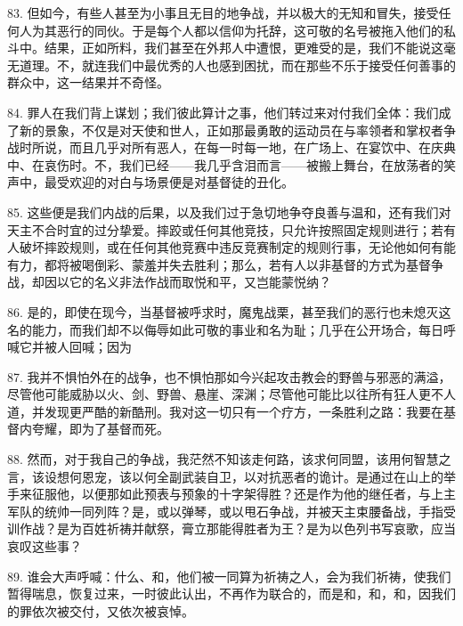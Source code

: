 83. 但如今，有些人甚至为小事且无目的地争战，并以极大的无知和冒失，接受任何人为其恶行的同伙。于是每个人都以信仰为托辞，这可敬的名号被拖入他们的私斗中。结果，正如所料，我们甚至在外邦人中遭恨，更难受的是，我们不能说这毫无道理。不，就连我们中最优秀的人也感到困扰，而在那些不乐于接受任何善事的群众中，这一结果并不奇怪。\par

84. 罪人在我们背上谋划；我们彼此算计之事，他们转过来对付我们全体：我们成了新的景象，不仅是对天使和世人，正如那最勇敢的运动员在与率领者和掌权者争战时所说，而且几乎对所有恶人，在每一时每一地，在广场上、在宴饮中、在庆典中、在哀伤时。不，我们已经——我几乎含泪而言——被搬上舞台，在放荡者的笑声中，最受欢迎的对白与场景便是对基督徒的丑化。\par

85. 这些便是我们内战的后果，以及我们过于急切地争夺良善与温和，还有我们对天主不合时宜的过分挚爱。摔跤或任何其他竞技，只允许按照固定规则进行；若有人破坏摔跤规则，或在任何其他竞赛中违反竞赛制定的规则行事，无论他如何有能有力，都将被喝倒彩、蒙羞并失去胜利；那么，若有人以非基督的方式为基督争战，却因以它的名义非法作战而取悦和平，又岂能蒙悦纳？\par

86. 是的，即使在现今，当基督被呼求时，魔鬼战栗，甚至我们的恶行也未熄灭这名的能力，而我们却不以侮辱如此可敬的事业和名为耻；几乎在公开场合，每日呼喊它并被人回喊；因为\par

87. 我并不惧怕外在的战争，也不惧怕那如今兴起攻击教会的野兽与邪恶的满溢，尽管他可能威胁以火、剑、野兽、悬崖、深渊；尽管他可能比以往所有狂人更不人道，并发现更严酷的新酷刑。我对这一切只有一个疗方，一条胜利之路：我要在基督内夸耀，即为了基督而死。\par

88. 然而，对于我自己的争战，我茫然不知该走何路，该求何同盟，该用何智慧之言，该设想何恩宠，该以何全副武装自卫，以对抗恶者的诡计。是通过在山上的举手来征服他，以便那如此预表与预象的十字架得胜？还是作为他的继任者，与上主军队的统帅一同列阵？是，或以弹琴，或以甩石争战，并被天主束腰备战，手指受训作战？是为百姓祈祷并献祭，膏立那能得胜者为王？是为以色列书写哀歌，应当哀叹这些事？\par

89. 谁会大声呼喊：什么、和，他们被一同算为祈祷之人，会为我们祈祷，使我们暂得喘息，恢复过来，一时彼此认出，不再作为联合的，而是和，和，和，因我们的罪依次被交付，又依次被哀悼。\par

